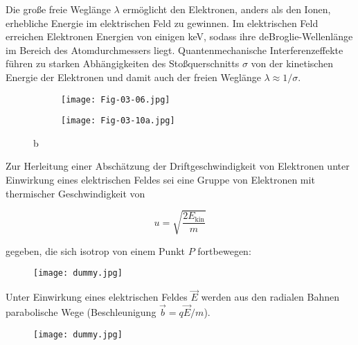 Die große freie Weglänge $\lambda$ ermöglicht den Elektronen, anders als den Ionen, erhebliche
Energie im elektrischen Feld zu gewinnen. Im elektrischen Feld erreichen Elektronen Energien von
einigen keV, sodass ihre deBroglie-Wellenlänge im Bereich des Atomdurchmessers liegt.
Quantenmechanische Interferenzeffekte führen zu starken Abhängigkeiten des Stoßquerschnitts $\sigma$
von der kinetischen Energie der Elektronen und damit auch der freien Weglänge $\lambda\approx
1/\sigma$.


\begin{figure}[htbp]
	\begin{minipage}[b]{0.65\textwidth}
		\begin{figure}[H]
		\centering
		\texttt{[image: Fig-03-06.jpg]}
		\end{figure}
	\end{minipage}
	\hspace{0.5cm}
	\begin{minipage}[b]{0.25\textwidth}
		\begin{figure}[H]
		\centering
		\texttt{[image: Fig-03-10a.jpg]}
		\end{figure}
	\end{minipage}
	\caption{b}
	\label{rekristall} 
\end{figure}

Zur Herleitung einer Abschätzung der Driftgeschwindigkeit von Elektronen unter Einwirkung eines
elektrischen Feldes sei eine Gruppe von Elektronen mit thermischer Geschwindigkeit von

\[u=\sqrt{\frac{2E_{\text{kin}}}{m}}  \]

gegeben, die sich isotrop von einem Punkt $P$ fortbewegen:

\begin{figure}[H]
	\centering
	\texttt{[image: dummy.jpg]}
\end{figure}

Unter Einwirkung eines elektrischen Feldes $\vec{E}$ werden aus den radialen Bahnen parabolische
Wege (Beschleunigung $\vec{b}=q\vec{E}/m$).

\begin{figure}[H]
	\centering
	\texttt{[image: dummy.jpg]}
\end{figure}

